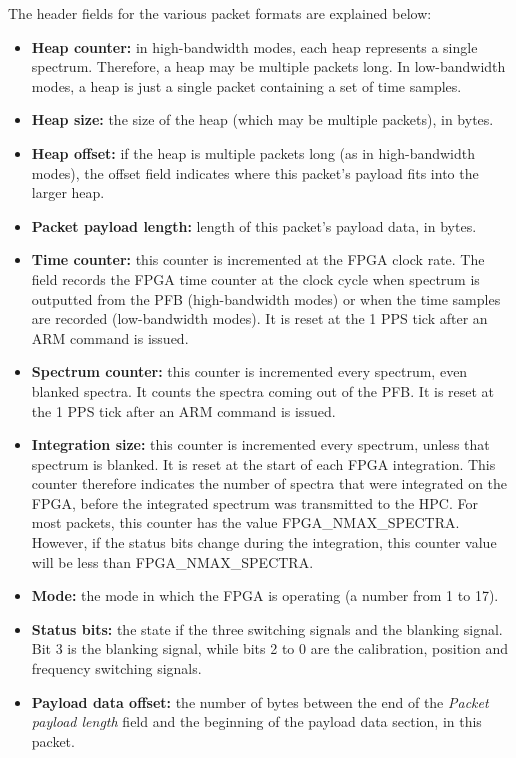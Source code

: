 \documentclass[11pt]{article} %
\begin{document}
The header fields for the various packet formats are explained below:
\begin{itemize}
\item {\bf Heap counter:} in high-bandwidth modes, each heap represents a single spectrum. Therefore, a heap may be multiple packets long. In low-bandwidth modes, a heap is just a single packet containing a set of time samples.
\item {\bf Heap size:} the size of the heap (which may be multiple packets), in bytes.
\item {\bf Heap offset:} if the heap is multiple packets long (as in high-bandwidth modes), the offset field indicates where this packet's payload fits into the larger heap.
\item {\bf Packet payload length:} length of this packet's payload data, in bytes.
\item {\bf Time counter:} this counter is incremented at the FPGA  clock rate. The field records the FPGA time counter at the clock cycle when spectrum is outputted from the PFB (high-bandwidth modes) or when the time samples are recorded (low-bandwidth modes). It is reset at the 1 PPS tick after an ARM command is issued.
\item {\bf Spectrum counter:} this counter is incremented every spectrum, even blanked spectra. It counts the spectra coming out of the PFB. It is reset at the 1 PPS tick after an ARM command is issued.
\item {\bf Integration size:} this counter is incremented every spectrum, unless that spectrum is blanked. It is reset at the start of each FPGA integration. This counter therefore indicates the number of spectra that were integrated on the FPGA, before the integrated spectrum was transmitted to the HPC. For most packets, this counter has the value FPGA\_NMAX\_SPECTRA. However, if the status bits change during the integration, this counter value will be less than FPGA\_NMAX\_SPECTRA.
\item {\bf Mode:} the mode in which the FPGA is operating (a number from 1 to 17).
\item {\bf Status bits:} the state if the three switching signals and the blanking signal. Bit 3 is the blanking signal, while bits 2 to 0 are the calibration, position and frequency switching signals.
\item {\bf Payload data offset: } the number of bytes between the end of the {\em Packet payload length} field and the beginning of the payload data section, in this packet.
\end{itemize}
\end{document}
